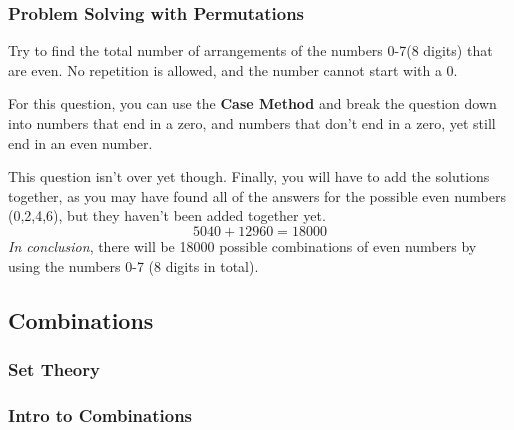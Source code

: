     \clearpage
        \subsubsection{Problem Solving with Permutations}
            \begin{example}
            Try to find the total number of arrangements of the numbers 0-7(8 digits) that are even. No repetition is allowed, and the number cannot start with a 0.
            \end{example}
            For this question, you can use the \textbf{Case Method} and break the question down into numbers that end in a zero, and numbers that don't end in a zero, yet still end in an even number. 
            \begin{parcolumns}{2}
            \colplacechunks
            \end{parcolumns}
            This question isn't over yet though. Finally, you will have to add the solutions together, as you may have found all of the answers for the possible even numbers (0,2,4,6), but they haven't been added together yet.
            $$5040 + 12960 = 18000$$
            \emph{In conclusion}, there will be 18000 possible combinations of even numbers by using the numbers 0-7 (8 digits in total).
            
    \subsection{Combinations}
        \subsubsection{Set Theory}
    \clearpage
        \subsubsection{Intro to Combinations}
            
